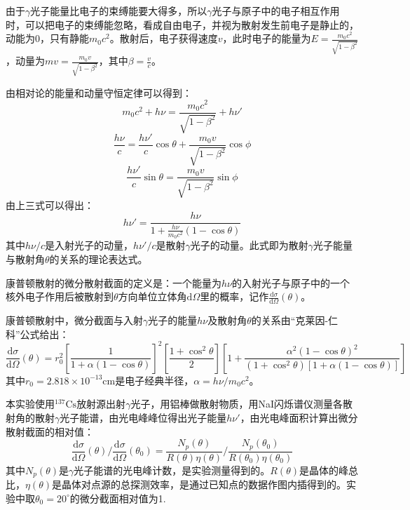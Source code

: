 \documentclass[aps,pre,12pt,preprint,onecolumn,showpacs,showkeys]{revtex4-1}
\def \d {\mathrm d}
\def \cs {\frac{\d \sigma}{\d \Omega}(\theta)}
\def \csref {\frac{\d \sigma}{\d \Omega}(\theta_0)}
\def \degree {^\circ}
\begin{document}
由于$\gamma$光子能量比电子的束缚能要大得多，所以$\gamma$光子与原子中的电子相互作用时，可以把电子的束缚能忽略，看成自由电子，并视为散射发生前电子是静止的，动能为0，只有静能$m_0 c^2$。散射后，电子获得速度$v$，此时电子的能量为$E=\frac{m_0 c^2}{\sqrt{1-\beta^2}}$，动量为$mv=\frac{m_0 v}{\sqrt{1-\beta^2}}$，其中$\beta = \frac{v}{c}$。

由相对论的能量和动量守恒定律可以得到：
\begin{equation}
m_0 c^2+h\nu = \frac{m_0 c^2}{\sqrt{1-\beta^2}} + h\nu'
\end{equation}
\begin{equation}
\frac{h\nu}{c}=\frac{h\nu'}{c}\cos \theta + \frac{m_0 v}{\sqrt{1-\beta^2}}\cos \phi
\end{equation}
\begin{equation}
\frac{h\nu'}{c}\sin \theta = \frac{m_0 v }{\sqrt{1-\beta^2}}\sin \phi
\end{equation}
由上三式可以得出：
\begin{equation}
h\nu' = \frac{h\nu}{1+\frac{h\nu}{m_0 c^2}(1-\cos \theta)}\label{eq:Eth}
\end{equation}
其中$h\nu/c$是入射光子的动量，$h \nu'/c$是散射$\gamma$光子的动量。此式即为散射$\gamma$光子能量与散射角$\theta$的关系的理论表达式。

康普顿散射的微分散射截面的定义是：一个能量为$h \nu$的入射光子与原子中的一个核外电子作用后被散射到$\theta$方向单位立体角$\mathrm d \Omega$里的概率，记作$\cs$。

康普顿散射中，微分截面与入射$\gamma$光子的能量$h\nu$及散射角$\theta$的关系由“克莱因-仁科”公式给出：
\begin{equation}
\cs=r_0^2\left[ \frac{1}{1+\alpha (1-\cos \theta)}\right]^2\left[\frac{1+\cos^2\theta}{2}\right]\left[1+\frac{\alpha^2(1-\cos \theta)^2}{(1+\cos^2\theta)[1+\alpha(1-\cos \theta)]}\right]\label{eq:csth}
\end{equation}
其中$r_0=2.818\times 10 ^{-13}\mathrm{cm}$是电子经典半径，$\alpha =h \nu/m_0 c^2$。

本实验使用$^{137}\mathrm{Cs}$放射源出射$\gamma$光子，用铝棒做散射物质，用NaI闪烁谱仪测量各散射角的散射$\gamma$光子能谱，由光电峰峰位得出光子能量$h\nu'$，由光电峰面积计算出微分散射截面的相对值：
\begin{equation}
\cs/\csref=\frac{N_p(\theta)}{R(\theta)\eta(\theta)}/\frac{N_p(\theta_0)}{R(\theta_0)\eta(\theta_0)}\label{eq:cs}
\end{equation}
其中$N_p(\theta)$是$\gamma$光子能谱的光电峰计数，是实验测量得到的。$R(\theta)$是晶体的峰总比，$\eta(\theta)$是晶体对点源的总探测效率，是通过已知点的数据作图内插得到的。实验中取$\theta_0=20\degree$的微分截面相对值为1.
\end{document}
